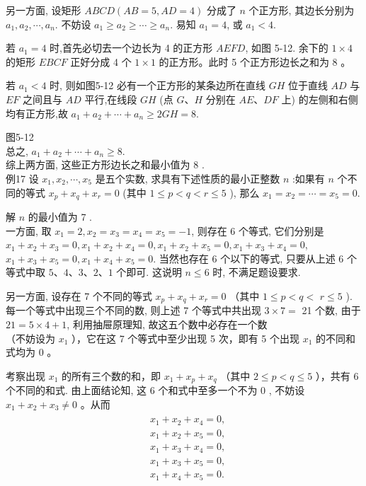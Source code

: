 \documentclass[10pt]{article}
\begin{document}
另一方面, 设矩形 $A B C D(A B=5, A D=4)$ 分成了 $n$ 个正方形, 其边长分别为 $a_{1}, a_{2}, \cdots, a_{n}$. 不妨设 $a_{1} \geqslant a_{2} \geqslant \cdots \geqslant a_{n}$. 易知 $a_{1}=4$, 或 $a_{1}<4$.

若 $a_{1}=4$ 时,首先必切去一个边长为 4 的正方形 $A E F D$, 如图 5-12. 余下的 $1 \times 4$ 的矩形 $E B C F$ 正好分成 4 个 $1 \times 1$ 的正方形。此时 5 个正方形边长之和为 8 。

若 $a_{1}<4$ 时, 则如图5-12 必有一个正方形的某条边所在直线 $G H$ 位于直线 $A D$ 与 $E F$ 之间且与 $A D$ 平行,在线段 $G H$ (点 $G 、 H$ 分别在 $A E 、 D F$ 上) 的左侧和右侧均有正方形,故 $a_{1}+a_{2}+\cdots+a_{n} \geqslant 2 G H=8$.

图5-12\\
总之, $a_{1}+a_{2}+\cdots+a_{n} \geqslant 8$.\\
综上两方面, 这些正方形边长之和最小值为 8 .\\
例17 设 $x_{1}, x_{2}, \cdots, x_{5}$ 是五个实数, 求具有下述性质的最小正整数 $n$ :如果有 $n$ 个不同的等式 $x_{p}+x_{q}+x_{r}=0$ (其中 $1 \leqslant p<q<r \leqslant 5$ ), 那么 $x_{1}=x_{2}=\cdots=x_{5}=0$.

解 $n$ 的最小值为 7 .\\
一方面, 取 $x_{1}=2, x_{2}=x_{3}=x_{4}=x_{5}=-1$, 则存在 6 个等式, 它们分别是 $x_{1}+x_{2}+x_{3}=0, x_{1}+x_{2}+x_{4}=0, x_{1}+x_{2}+x_{5}=0, x_{1}+x_{3}+x_{4}=0$, $x_{1}+x_{3}+x_{5}=0, x_{1}+x_{4}+x_{5}=0$. 当然也存在 6 个以下的等式, 只要从上述 6 个等式中取 $5 、 4 、 3 、 2 、 1$ 个即可. 这说明 $n \leqslant 6$ 时, 不满足题设要求.

另一方面, 设存在 7 个不同的等式 $x_{p}+x_{q}+x_{r}=0$ （其中 $1 \leqslant p<q<$ $r \leqslant 5$ ). 每一个等式中出现三个不同的数, 则上述 7 个等式中共出现 $3 \times 7=$ 21 个数, 由于 $21=5 \times 4+1$, 利用抽屉原理知, 故这五个数中必存在一个数\\
（不妨设为 $x_{1}$ ），它在这 7 个等式中至少出现 5 次，即有 5 个出现 $x_{1}$ 的不同和式均为 0 。

考察出现 $x_{1}$ 的所有三个数的和，即 $x_{1}+x_{p}+x_{q}$ （其中 $2 \leqslant p<q \leqslant 5$ ），共有 6 个不同的和式. 由上面结论知, 这 6 个和式中至多一个不为 0 , 不妨设 $x_{1}+x_{2}+x_{3} \neq 0$ 。从而\\
\begin{align*}
\begin{aligned}
& x_{1}+x_{2}+x_{4}=0, \\
& x_{1}+x_{2}+x_{5}=0, \\
& x_{1}+x_{3}+x_{4}=0, \\
& x_{1}+x_{3}+x_{5}=0, \\
& x_{1}+x_{4}+x_{5}=0 .
\end{aligned}
\end{align*}
\end{document}
